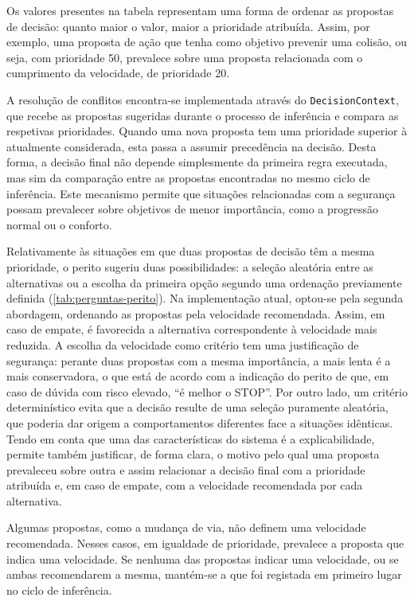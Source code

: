 Os valores presentes na tabela representam uma forma de ordenar as propostas
de decisão: quanto maior o valor, maior a prioridade atribuída. Assim, por
exemplo, uma proposta de ação que tenha como objetivo prevenir uma colisão, ou
seja, com prioridade 50, prevalece sobre uma proposta relacionada com o
cumprimento da velocidade, de prioridade 20.

A resolução de conflitos encontra-se implementada através do
\texttt{DecisionContext}, que recebe as propostas sugeridas durante o processo
de inferência e compara as respetivas prioridades. Quando uma nova proposta
tem uma prioridade superior à atualmente considerada, esta passa a assumir
precedência na decisão. Desta forma, a decisão final não depende simplesmente
da primeira regra executada, mas sim da comparação entre as propostas
encontradas no mesmo ciclo de inferência. Este mecanismo permite que situações
relacionadas com a segurança possam prevalecer sobre objetivos de menor
importância, como a progressão normal ou o conforto.

Relativamente às situações em que duas propostas de decisão têm a mesma
prioridade, o perito sugeriu duas possibilidades: a seleção aleatória entre as
alternativas ou a escolha da primeira opção segundo uma ordenação previamente
definida (\cref{tab:perguntas-perito}). Na implementação atual, optou-se pela
segunda abordagem, ordenando as propostas pela velocidade recomendada. Assim,
em caso de empate, é favorecida a alternativa correspondente à velocidade mais
reduzida. A escolha da velocidade como critério tem uma justificação de
segurança: perante duas propostas com a mesma importância, a mais lenta é a
mais conservadora, o que está de acordo com a indicação do perito de que, em
caso de dúvida com risco elevado, \enquote{é melhor o STOP}. Por outro lado, um
critério determinístico evita que a decisão resulte de uma seleção puramente
aleatória, que poderia dar origem a comportamentos diferentes face a situações
idênticas. Tendo em conta que uma das características do sistema é a
explicabilidade, permite também justificar, de forma clara, o motivo pelo qual
uma proposta prevaleceu sobre outra e assim relacionar a decisão final com a
prioridade atribuída e, em caso de empate, com a velocidade recomendada por
cada alternativa.

Algumas propostas, como a mudança de via, não definem uma velocidade
recomendada. Nesses casos, em igualdade de prioridade, prevalece a proposta que
indica uma velocidade. Se nenhuma das propostas indicar uma velocidade, ou se
ambas recomendarem a mesma, mantém-se a que foi registada em primeiro lugar no
ciclo de inferência.


